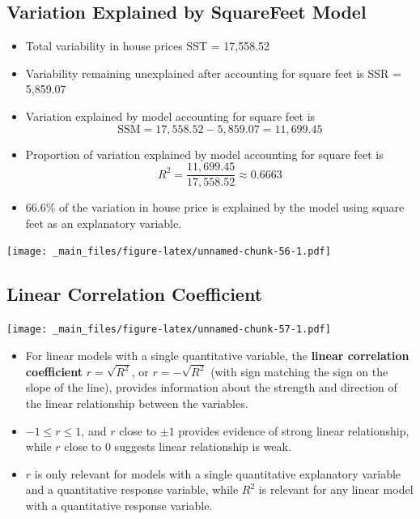 \documentclass[]{book}
\begin{document}
\subsection{Variation Explained by SquareFeet
Model}\label{variation-explained-by-squarefeet-model-1}

\begin{itemize}
\item
  Total variability in house prices SST = 17,558.52\\
\item
  Variability remaining unexplained after accounting for square feet is
  SSR = 5,859.07\\
\item
  Variation explained by model accounting for square feet is
  \[ \text{SSM} = 17,558.52 - 5,859.07 = 11,699.45 \]
\item
  Proportion of variation explained by model accounting for square feet
  is \[ R^2=\frac{11,699.45}{17,558.52}\approx0.6663\]
\item
  66.6\% of the variation in house price is explained by the model using
  square feet as an explanatory variable.
\end{itemize}

\texttt{[image: \_main\_files/figure-latex/unnamed-chunk-56-1.pdf]}

\subsection{Linear Correlation
Coefficient}\label{linear-correlation-coefficient}

\texttt{[image: \_main\_files/figure-latex/unnamed-chunk-57-1.pdf]}

\begin{itemize}
\item
  For linear models with a single quantitative variable, the
  \textbf{linear correlation coefficient} \(r=\sqrt{R^2}\), or
  \(r=-\sqrt{R^2}\) (with sign matching the sign on the slope of the
  line), provides information about the strength and direction of the
  linear relationship between the variables.
\item
  \(-1 \leq r \leq 1\), and \(r\) close to \(\pm1\) provides evidence of
  strong linear relationship, while \(r\) close to 0 suggests linear
  relationship is weak.
\item
  \(r\) is only relevant for models with a single quantitative
  explanatory variable and a quantitative response variable, while
  \(R^2\) is relevant for any linear model with a quantitative response
  variable.
\end{itemize}
\end{document}
